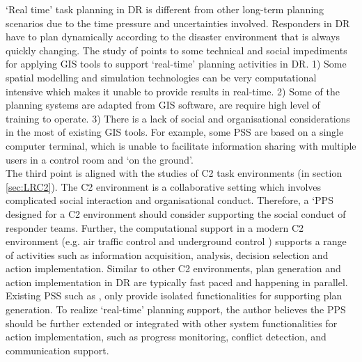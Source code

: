 `Real time' task planning in \ac{DR} is different from other long-term planning scenarios due to the time pressure and uncertainties involved.  Responders in \ac{DR} have to plan dynamically according to the disaster environment that is always quickly changing. The study of \cite{Zerger2003} points to some technical and social impediments for applying \ac{GIS} tools to support `real-time' planning activities in \ac{DR}. 1) Some spatial modelling and simulation technologies \citep{Eglese1994} can be very computational intensive which makes it unable to provide results in real-time. 2) Some of the planning systems are adapted from \ac{GIS} software, are require high level of training to operate. 3) There is a lack of social and organisational considerations in the most of existing \ac{GIS} tools. For example, some \ac{PSS} are based on a single computer terminal, which is unable to facilitate information sharing with multiple users in a control room and `on the ground'. \\

The third point is aligned with the studies of \ac{C2} task environments (in section \ref{sec:LRC2}). The \ac{C2} environment is a collaborative setting which involves complicated social interaction and organisational conduct. Therefore, a `\ac{PPS} designed for a \ac{C2} environment should consider supporting the social conduct of responder teams. Further, the computational support in a modern \ac{C2} environment (e.g. air traffic control \citep{Mercer2014} and underground control \citep{Sharples2011}) supports a range of activities such as information acquisition, analysis, decision selection and action implementation. Similar to other \ac{C2} environments, plan generation and action implementation in DR are typically fast paced and happening in parallel. Existing \ac{PSS} such as \citep{IntergraphCorporation2000}, \citep{Eglese1994} only provide isolated functionalities for supporting plan generation. To realize `real-time' planning support, the author believes the PPS should be further extended or integrated with other system functionalities for action implementation, such as progress monitoring, conflict detection, and communication support.\\


